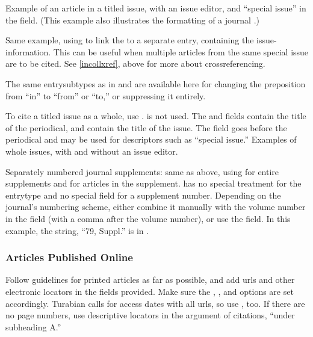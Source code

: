 \documentclass{ltxdockit}[2010/02/12]
\begin{document}
Example of an article in a titled issue, with an issue editor, and ``special issue'' in the  field. (This example also illustrates the formatting of a journal .)\autocites{241}

Same example, using  to link the  to a separate  entry, containing the issue-information.\autocites[][]{241-xref} This can be useful when multiple articles from the same special issue are to be cited. See \ref{incollxref}, above for more about crossreferencing. 

The same entrysubtypes as in  and  are available here for changing the preposition from ``in'' to ``from'' or ``to,'' or suppressing it entirely.

To cite a titled issue as a whole, use .   is not used. The  and  fields contain the title of the periodical,  and  contain the title of the issue. The  field goes before the periodical  and may be used for descriptors such as ``special issue.'' Examples of whole issues, with and without an issue editor.\autocites{maienschein1981special-issue, 2185}

Separately numbered journal supplements: same as above, using  for entire supplements and  for articles in the supplement.  has no special treatment for the  entrytype and no special field for a supplement number. Depending on the journal's numbering scheme, either combine it manually with the volume number in the  field (with a comma after the volume number), or use the  field. In this example, the string, ``79, Suppl.'' is in .\autocites[][]{2387}

\subsubsection{Articles Published Online}

Follow guidelines for printed articles as far as possible, and add urls and other electronic locators in the fields provided. Make sure the , , and  options are set accordingly. Turabian calls for access dates with all urls, so use , too.\autocites[][]{fagan2007wallace-darwin-} If there are no page numbers, use descriptive locators in the  argument of citations, \eg ``under subheading A.''
\end{document}
